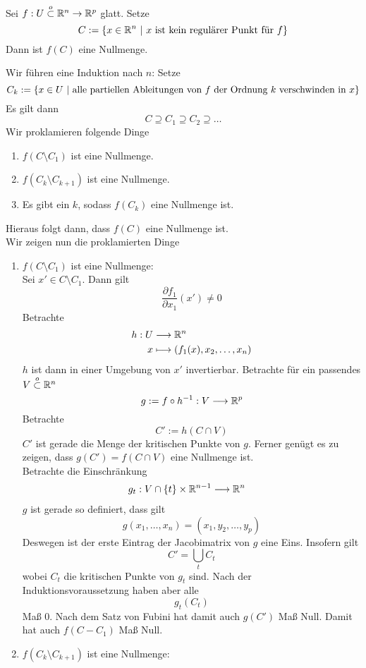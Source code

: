 Sei $f : U \overset{o}{\subset} \mathbb{R}^n \overset{}{\rightarrow} \mathbb{R}^p$ glatt. Setze
\[ C:= \set{x \in \R^n}{x \text{ ist kein regulärer Punkt für }f} \]
Dann ist $f(C)$ eine {Nullmenge}.
\begin{Beweis}{}
Wir führen eine Induktion nach $n$:
Setze
\[ C_k := \set{x \in U}{\text{alle partiellen Ableitungen von }f\text{ der Ordnung } k\text{ verschwinden in }x} \]
Es gilt dann
\[ C \supseteq C_1 \supseteq C_2 \supseteq \ldots \]
Wir proklamieren folgende Dinge
\begin{enumerate}[(1)]
	\item $f(C\setminus C_1)$ ist eine Nullmenge.
	\item $f(C_k\setminus C_{k+1} )$ ist eine Nullmenge.
	\item Es gibt ein $k$, sodass $f(C_k)$ eine Nullmenge ist.
\end{enumerate}
Hieraus folgt dann, dass $f(C)$ eine Nullmenge ist.\\
Wir zeigen nun die proklamierten Dinge
\begin{enumerate}[(1)]
	\item $f(C\setminus C_1)$ ist eine Nullmenge:\\
	Sei $x' \in C\setminus C_1$. Dann gilt
	\[ \frac{\partial f_1}{\partial x_1}(x') \neq  0 \]
	Betrachte
	\begin{align*}
	h : U & \overset{}{\longrightarrow} \mathbb{R}^n\\
	x & \longmapsto (f_1(x), x_2, \ldots, x_n)
	\end{align*}
	$h$ ist dann in einer Umgebung von $x'$ invertierbar. Betrachte für ein passendes $V \overset{o}{\subset} \mathbb{R}^n$
	\[ g:= f\circ h^{-1} : V \overset{}{\longrightarrow} \mathbb{R}^p \]
	Betrachte
	\[ C' := h(C\cap V) \]
	$C'$ ist gerade die Menge der kritischen Punkte von $g$. Ferner genügt es zu zeigen, dass $g(C') = f(C\cap V)$ eine Nullmenge ist.\\
	Betrachte die Einschränkung
	\begin{align*}
	g_t : V \cap \{t\} \times \mathbb{R}^{n-1} & \overset{}{\longrightarrow} \mathbb{R}^n
	\end{align*}
	$g$ ist gerade so definiert, dass gilt
	\[ g(x_1, \ldots, x_n) = (x_1, y_2,\ldots, y_p) \]
	Deswegen ist der erste Eintrag der Jacobimatrix von $g$ eine Eins. Insofern gilt
	\[ C' = \bigcup_t C_t \]
	wobei $C_t$ die kritischen Punkte von $g_t$ sind. Nach der Induktionsvoraussetzung haben aber alle
	\[ g_t(C_t) \]
	Maß 0. Nach dem Satz von Fubini hat damit auch $g(C')$ Maß Null. Damit hat auch $f(C - C_1)$ Maß Null.
	\item $f(C_k\setminus C_{k+1} )$ ist eine Nullmenge:\\

\end{enumerate}
\end{Beweis}
